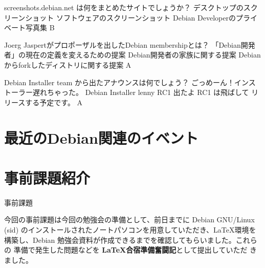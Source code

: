 \documentclass[cjk,dvipdfmx,12pt]{beamer}
\begin{document}
 \santaku
 {screenshots.debian.net は何をまとめたサイトでしょうか？}
 {デスクトップのスクリーンショット}
 {ソフトウェアのスクリーンショット}
 {Debian Developerのプライベート写真集}
 {B}

 \santaku
 {Joerg Jaspertがプロポーザルを出したDebian membershipとは？}
 {「Debian開発者」の現在の定義を変えるための提案}
 {Debian開発者の家族に関する提案}
 {Debianからforkしたディストリに関する提案}
 {A}

 \santaku
 {Debian Installer team から出たアナウンスは何でしょう？}
 {ごっめーん！インストーラー遅れちゃった。}
 {Debian Installer lenny RC1 出たよ}
 {RC1 は飛ばして リリースする予定です。}
 {A}


\section{最近のDebian関連のイベント}


\section{事前課題紹介}

\begin{frame}{事前課題}

今回の事前課題は今回の勉強会の準備として、前日までに Debian GNU/Linux
(sid) のインストールされたノートパソコンを用意していただき、\LaTeX 環境を
構築し、Debian 勉強会資料が作成できるまでを確認してもらいました。これらの
準備で発生した問題などを {\bf \LaTeX 合宿準備奮闘記}として提出していただ
きました。

\end{frame}






\end{document}
